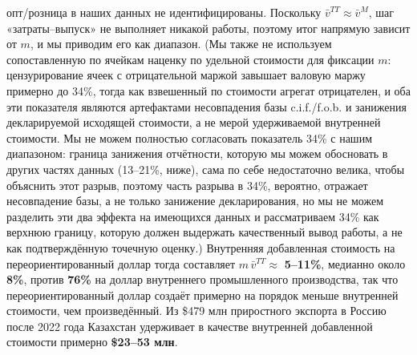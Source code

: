 \documentclass[12pt]{article}
\begin{document}
опт/розница в наших данных не идентифицированы. Поскольку $\bar v^{TT} \approx \bar v^{M}$,
шаг «затраты--выпуск» не выполняет никакой работы, поэтому итог напрямую зависит от $m$, и
мы приводим его как диапазон. (Мы также не используем сопоставленную по ячейкам наценку по
удельной стоимости для фиксации $m$: цензурирование ячеек с отрицательной маржой завышает
валовую маржу примерно до 34\%, тогда как взвешенный по стоимости агрегат отрицателен, и оба
эти показателя являются артефактами несовпадения базы c.i.f./f.o.b. и занижения
декларируемой исходящей стоимости, а не мерой удерживаемой внутренней стоимости. Мы не
можем полностью согласовать показатель 34\% с нашим диапазоном: граница занижения
отчётности, которую мы можем обосновать в других частях данных (13--21\%, ниже), сама по
себе недостаточно велика, чтобы объяснить этот разрыв, поэтому часть разрыва в 34\%,
вероятно, отражает несовпадение базы, а не только занижение декларирования, но мы не можем
разделить эти два эффекта на имеющихся данных и рассматриваем 34\% как верхнюю границу,
которую должен выдержать качественный вывод работы, а не как подтверждённую точечную
оценку.) Внутренняя добавленная стоимость на переориентированный доллар тогда составляет
$m\,\bar v^{TT} \approx$ \textbf{5--11\%}, медианно около \textbf{8\%}, против
\textbf{76\%} на доллар внутреннего промышленного производства, так что переориентированный
доллар создаёт примерно на порядок меньше внутренней стоимости, чем произведённый. Из
\$479 млн приростного экспорта в Россию после 2022 года Казахстан удерживает в качестве
внутренней добавленной стоимости примерно \textbf{\$23--53 млн}.
\end{document}
